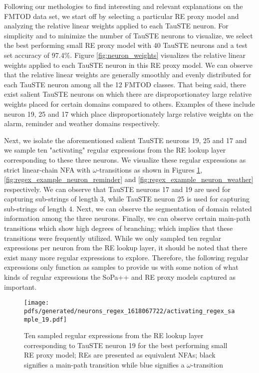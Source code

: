 Following our methologies to find interesting and relevant explanations on the
FMTOD data set, we start off by selecting a particular RE proxy model and
analyzing the relative linear weights applied to each TauSTE neuron. For
simplicity and to minimize the number of TauSTE neurons to visualize, we select
the best performing small RE proxy model with 40 TauSTE neurons and a test set
accuracy of 97.4$\%$. Figure \ref{fig:neuron_weights} visualizes the relative
linear weights applied to each TauSTE neuron in this RE proxy model. We can
observe that the relative linear weights are generally smoothly and evenly
distributed for each TauSTE neuron among all the 12 FMTOD classes. That being
said, there exist salient TauSTE neurons on which there are disproportionatey
large relative weights placed for certain domains compared to others. Examples
of these include neuron 19, 25 and 17 which place disproportionately large
relative weights on the alarm, reminder and weather domains respectively.

Next, we isolate the aforementioned salient TauSTE neurons 19, 25 and 17 and we
sample ten "activating" regular expressions from the RE lookup layer
corresponding to these three neurons. We visualize these regular expressions as
strict linear-chain NFA with $\omega$-transitions as shown in Figures
\ref{fig:regex_example_neuron_alarm}, \ref{fig:regex_example_neuron_reminder}
and \ref{fig:regex_example_neuron_weather} respectively. We can observe that
TauSTE neurons 17 and 19 are used for capturing sub-strings of length 3, while
TauSTE neuron 25 is used for capturing sub-strings of length 4. Next, we can
observe the segmentation of domain related information among the three neurons.
Finally, we can observe certain main-path transitions which show high degrees of
branching; which implies that these transitions were frequently utilized. While
we only sampled ten regular expressions per neuron from the RE lookup layer, it
should be noted that there exist many more regular expressions to explore.
Therefore, the following regular expressions only function as samples to provide
us with some notion of what kinds of regular expressions the SoPa++ and RE proxy
models captured as important.

\newpage

\begin{figure}[t!]
  \centering \texttt{[image: pdfs/generated/neurons\_regex\_1618067722/activating\_regex\_sample\_19.pdf]}
  \caption[Ten sampled regular expressions from the RE lookup layer
  corresponding to TauSTE neuron 19 for the best performing small RE proxy
  model]{Ten sampled regular expressions from the RE lookup layer
    corresponding to TauSTE neuron 19 for the best performing small RE proxy
    model; REs are presented as equivalent NFAs; black signifies a
    main-path transition while blue signifies a $\omega$-transition}
  \label{fig:regex_example_neuron_alarm}
\end{figure}

